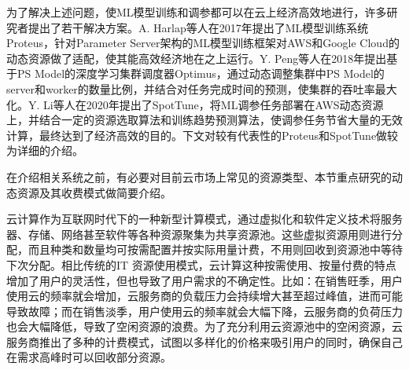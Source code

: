 为了解决上述问题，使ML模型训练和调参都可以在云上经济高效地进行，许多研究者提出了若干解决方案。A. Harlap等人在2017年提出了ML模型训练系统Proteus\parencite{harlap2017proteus}，针对Parameter Server架构的ML模型训练框架对AWS和Google Cloud的动态资源做了适配，使其能高效经济地在之上运行。Y. Peng等人在2018年提出基于PS Model的深度学习集群调度器Optimus\parencite{peng2018optimus}，通过动态调整集群中PS Model的server和worker的数量比例，并结合对任务完成时间的预测，使集群的吞吐率最大化。Y. Li等人在2020年提出了SpotTune\parencite{li2020spottune}，将ML调参任务部署在AWS动态资源上，并结合一定的资源选取算法和训练趋势预测算法，使调参任务节省大量的无效计算，最终达到了经济高效的目的。下文对较有代表性的Proteus和SpotTune做较为详细的介绍。

在介绍相关系统之前，有必要对目前云市场上常见的资源类型、本节重点研究的动态资源及其收费模式做简要介绍。

云计算作为互联网时代下的一种新型计算模式，通过虚拟化和软件定义技术将服务器、存储、网络甚至软件等各种资源聚集为共享资源池。这些虚拟资源用则进行分配，而且种类和数量均可按需配置并按实际用量计费，不用则回收到资源池中等待下次分配。相比传统的IT 资源使用模式，云计算这种按需使用、按量付费的特点增加了用户的灵活性，但也导致了用户需求的不确定性。比如：在销售旺季，用户使用云的频率就会增加，云服务商的负载压力会持续增大甚至超过峰值，进而可能导致故障；而在销售淡季，用户使用云的频率就会大幅下降，云服务商的负荷压力也会大幅降低，导致了空闲资源的浪费。为了充分利用云资源池中的空闲资源，云服务商推出了多种的计费模式，试图以多样化的价格来吸引用户的同时，确保自己在需求高峰时可以回收部分资源。

